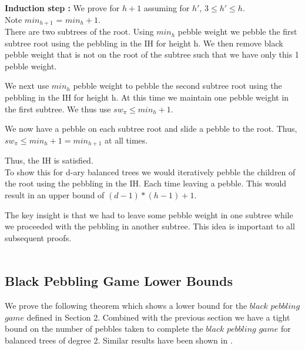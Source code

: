 \documentclass[12pt]{article}
\begin{document}


\noindent
{\bf Induction step :} We prove for $h+1$ assuming for $h'$,
$3\le h' \le h$.\\
Note $min_{h+1}$ = $min_h + 1$.\\

There are two subtrees of the root. Using $min_h$ pebble weight we pebble the first subtree root using the pebbling in the IH for height h. We then remove black pebble weight that is not on the root of the subtree such that we have only this 1 pebble weight. 

We next use $min_h$ pebble weight to pebble the second subtree root using the pebbling in the IH for height h. At this time we maintain one pebble weight in the first subtree. We thus use $sw_\pi \leq min_h + 1$.

We now have a pebble on each subtree root and slide a pebble to the root. Thus, $sw_\pi \leq min_h + 1 = min_{h+1}$ at all times.

Thus, the IH is satisfied.\\

To show this for d-ary balanced trees we would iteratively pebble the children of the root using the pebbling in the IH. Each time leaving a pebble. This would result in an upper bound of $(d-1) * (h-1) + 1$.

The key insight is that we had to leave some pebble weight in one subtree while we proceeded with the pebbling in another subtree. This idea is important to all subsequent proofs.\\\\








\subsection{Black Pebbling Game Lower Bounds} 


We prove the following theorem which shows a lower bound for the $black$ $pebbling$ $game$ defined in Section 2. Combined with the previous section we have a tight bound on the number of pebbles taken to complete the $black$ $pebbling$ $game$ for balanced trees of degree 2. Similar results have been shown in \cite{c:pebjournal}.\\
\end{document}

